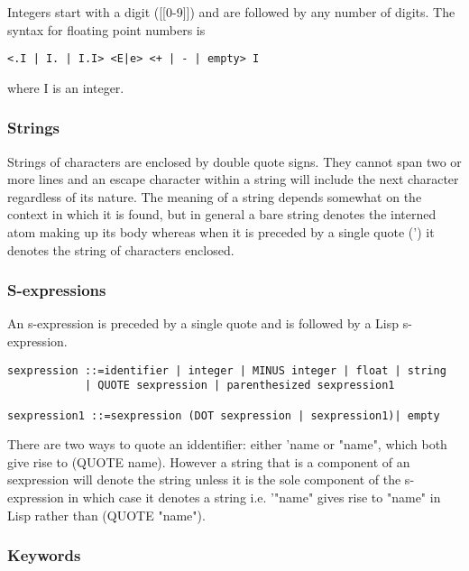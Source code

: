 \documentclass{article}
\begin{document}
Integers start with a digit ([[0-9]]) and are followed by any number
of digits.  The syntax for floating point numbers is
\begin{verbatim}
<.I | I. | I.I> <E|e> <+ | - | empty> I 
\end{verbatim}
where I is an integer.
 
\subsubsection{Strings}
\label{sec:boot:string}
 
Strings of characters are enclosed by double quote signs. They cannot
span two or more lines and an escape character within a string will
include the next character regardless of its nature.
The meaning of a string depends somewhat on the context in which
it is found, but in general a bare string denotes the interned atom
making up its body whereas when it is preceded by a single quote (')
it denotes the string of characters enclosed.
 
\subsubsection{S-expressions}
\label{sec:boot:s-expression}
 
An s-expression is preceded by a single quote and is followed by
a Lisp s-expression.
\begin{verbatim}  
sexpression ::=identifier | integer | MINUS integer | float | string
            | QUOTE sexpression | parenthesized sexpression1
 
sexpression1 ::=sexpression (DOT sexpression | sexpression1)| empty
\end{verbatim}  

There are two ways to quote an iddentifier: either 'name or "name", which
both give rise to (QUOTE name). However a string that is a
component of an sexpression will denote the string unless it is the
sole component of the s-expression in which case it denotes a string
i.e. '"name" gives rise to "name" in Lisp rather than (QUOTE "name").
 
 
\subsubsection{Keywords}
\label{sec:boot:keyword}
 
\end{document}
